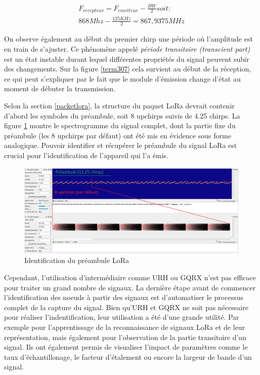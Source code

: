 \begin{align}
    F_{recepteur} = F_{emetteur} - \frac{BW}{2} soit: \\
    868Mhz - \frac{125KHz}{2} = 867,9375MHz
\end{align}

On observe également au début du premier chirp une période où l'amplitude est en train de s'ajuster. Ce phénomène appelé \textit{période transitoire (transcient part)} est un état instable durant lequel différentes propriétés du signal peuvent subir des changements. Sur la figure \ref{term307} cela survient au début de la réception, ce qui peut s'expliquer par le fait que le module d'émission change d'état au moment de débuter la transmission.

\vspace{0.1cm}

Selon la section \ref{packetlora}, la structure du paquet LoRa devrait contenir d'abord les symboles du préambule, soit 8 upchirps suivis de 4.25 chirps. La figure \ref{term308} montre le spectrogramme du signal complet, dont la partie fixe du préambule (les 8 upchirps par défaut) ont été mis en évidence sous forme analogique. Pouvoir identifier et récupérer le préambule du signal LoRa est crucial pour l'identification de l'appareil qui l'a émis.


\begin{figure}[h]
\centering

\includegraphics[scale=0.18]{images/urh6.png}
\caption{Identification du préambule LoRa}\label{term308}
\end{figure}

Cependant, l'utilisation d'intermédiaire comme URH ou GQRX n'est pas efficace pour traiter un grand nombre de signaux. La dernière étape avant de commencer l'identification des noeuds à partir des signaux est d'automatiser le processus complet de la capture du signal. Bien qu'URH et GQRX ne soit pas nécessaire pour réaliser l'indentification, leur utilisation a été d'une grande utilité. Par exemple pour l'apprentissage de la reconnaissance de signaux LoRa et de leur représentation, mais également pour l'observation de la partie transitoire d'un signal. Ils ont également permis de visualiser l'impact de paramètres comme le taux d'échantillonage, le facteur d'étalement ou encore la largeur de bande d'un signal.

